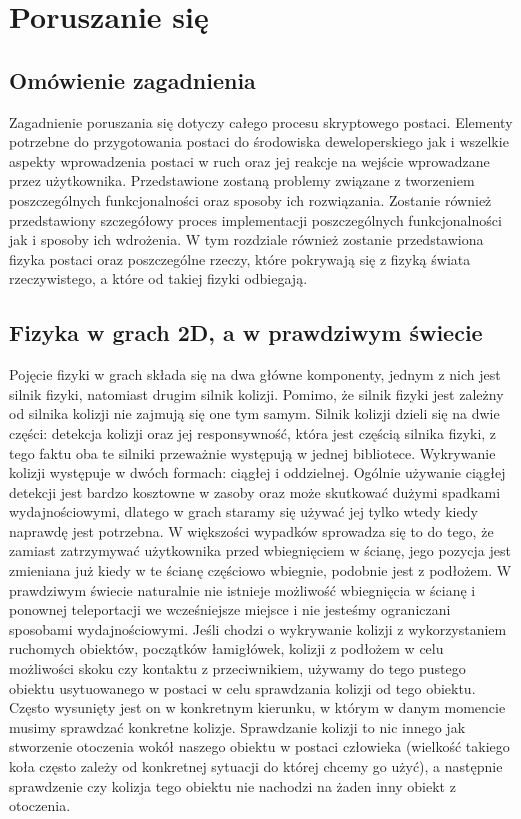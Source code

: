 \documentclass[oneside,polski,logo]{amuthesis}
\begin{document}
\section{Poruszanie się}
\subsection{Omówienie zagadnienia}
Zagadnienie poruszania się dotyczy całego procesu skryptowego postaci. Elementy potrzebne do przygotowania postaci do środowiska deweloperskiego jak i wszelkie aspekty wprowadzenia postaci w ruch oraz jej reakcje na wejście wprowadzane przez użytkownika. Przedstawione zostaną problemy związane z tworzeniem poszczególnych funkcjonalności oraz sposoby ich rozwiązania. Zostanie również przedstawiony szczegółowy proces implementacji poszczególnych funkcjonalności jak i sposoby ich wdrożenia. W tym rozdziale również zostanie przedstawiona fizyka postaci oraz poszczególne rzeczy, które pokrywają się z fizyką świata rzeczywistego, a które od takiej fizyki odbiegają.
\subsection{Fizyka w grach 2D, a w prawdziwym świecie}
 Pojęcie fizyki w grach składa się na dwa główne komponenty, jednym z nich jest silnik fizyki, natomiast drugim silnik kolizji. Pomimo, że silnik fizyki jest zależny od silnika kolizji nie zajmują się one tym samym.
Silnik kolizji dzieli się na dwie części: detekcja kolizji oraz jej responsywność, która jest częścią silnika fizyki, z tego faktu oba te silniki przeważnie występują w jednej bibliotece. Wykrywanie kolizji występuje w dwóch formach: ciągłej i oddzielnej. Ogólnie używanie ciągłej detekcji jest bardzo kosztowne w zasoby oraz może skutkować dużymi spadkami wydajnościowymi, dlatego w grach staramy się używać jej tylko wtedy kiedy naprawdę jest potrzebna. W większości wypadków sprowadza się to do tego, że zamiast zatrzymywać użytkownika przed wbiegnięciem w ścianę, jego pozycja jest zmieniana już kiedy w te ścianę częściowo wbiegnie, podobnie jest z podłożem. W prawdziwym świecie naturalnie nie istnieje możliwość wbiegnięcia w ścianę i ponownej teleportacji we wcześniejsze miejsce i nie jesteśmy ograniczani sposobami wydajnościowymi. Jeśli chodzi o wykrywanie kolizji z wykorzystaniem ruchomych obiektów, początków łamigłówek, kolizji z podłożem w celu możliwości skoku czy kontaktu z przeciwnikiem, używamy do tego pustego obiektu usytuowanego w postaci w celu sprawdzania kolizji od tego obiektu. Często wysunięty jest on w konkretnym kierunku, w którym w danym momencie musimy sprawdzać konkretne kolizje. Sprawdzanie kolizji to nic innego jak stworzenie otoczenia wokół naszego obiektu w postaci człowieka (wielkość takiego koła często zależy od konkretnej sytuacji do której chcemy go użyć), a następnie sprawdzenie czy kolizja tego obiektu nie nachodzi na żaden inny obiekt z otoczenia. 
\end{document}
